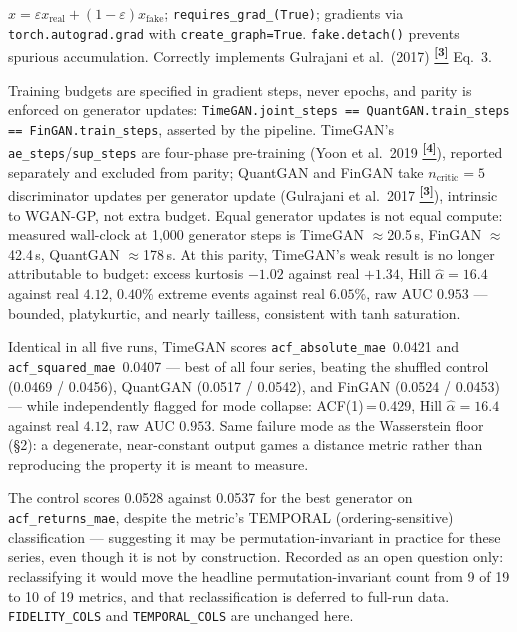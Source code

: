\documentclass[10pt]{article}
\newcommand{\auditrow}[5]{%
  \begin{tcolorbox}[mybox={#2}{#3},
    title={\textbf{[#1]}\quad #4},
    before skip=4pt, after skip=4pt, breakable]
  \small #5
  \end{tcolorbox}}
\newcommand{\tcite}[1]{%
  \hyperlink{R:#1}{\textsuperscript{\scriptsize\textbf{[#1]}}}}
\begin{document}
\auditrow{OK}{FGreen}{GBg}%
  {WGAN-GP gradient penalty computation is correct (QuantGAN \& FinGAN)}%
  {$\hat{x} = \varepsilon x_\text{real} + (1-\varepsilon)x_\text{fake}$; \texttt{requires\_grad\_(True)}; gradients via \texttt{torch.autograd.grad} with \texttt{create\_graph=True}. \texttt{fake.detach()} prevents spurious accumulation. Correctly implements Gulrajani et al.\ (2017)\tcite{3} Eq.~3.}

\auditrow{FIXED}{Amber}{ABg}%
  {TimeGAN training budget equalised on generator updates; result reattributed to architecture}%
  {Training budgets are specified in gradient steps, never epochs, and parity is enforced on generator updates: \texttt{TimeGAN.joint\_steps == QuantGAN.train\_steps == FinGAN.train\_steps}, asserted by the pipeline. TimeGAN's \texttt{ae\_steps}/\texttt{sup\_steps} are four-phase pre-training (Yoon et al.\ 2019\tcite{4}), reported separately and excluded from parity; QuantGAN and FinGAN take $n_\text{critic}=5$ discriminator updates per generator update (Gulrajani et al.\ 2017\tcite{3}), intrinsic to WGAN-GP, not extra budget. Equal generator updates is not equal compute: measured wall-clock at 1,000 generator steps is TimeGAN $\approx$20.5\,s, FinGAN $\approx$42.4\,s, QuantGAN $\approx$178\,s. At this parity, TimeGAN's weak result is no longer attributable to budget: excess kurtosis $-1.02$ against real $+1.34$, Hill $\hat\alpha=16.4$ against real $4.12$, $0.40\%$ extreme events against real $6.05\%$, raw AUC $0.953$ --- bounded, platykurtic, and nearly tailless, consistent with tanh saturation.}

\auditrow{CONCERN}{Amber}{ABg}%
  {A collapsed generator wins the volatility-clustering metrics}%
  {Identical in all five runs, TimeGAN scores \texttt{acf\_absolute\_mae}~0.0421 and \texttt{acf\_squared\_mae}~0.0407 --- best of all four series, beating the shuffled control (0.0469 / 0.0456), QuantGAN (0.0517 / 0.0542), and FinGAN (0.0524 / 0.0453) --- while independently flagged for mode collapse: ACF(1)\,=\,0.429, Hill $\hat\alpha=16.4$ against real $4.12$, raw AUC $0.953$. Same failure mode as the Wasserstein floor (\S2): a degenerate, near-constant output games a distance metric rather than reproducing the property it is meant to measure.}

\auditrow{OPEN QUESTION}{Indigo}{IBg}%
  {Shuffled control wins \texttt{acf\_returns\_mae} outright}%
  {The control scores 0.0528 against 0.0537 for the best generator on \texttt{acf\_returns\_mae}, despite the metric's TEMPORAL (ordering-sensitive) classification --- suggesting it may be permutation-invariant in practice for these series, even though it is not by construction. Recorded as an open question only: reclassifying it would move the headline permutation-invariant count from 9 of 19 to 10 of 19 metrics, and that reclassification is deferred to full-run data. \texttt{FIDELITY\_COLS} and \texttt{TEMPORAL\_COLS} are unchanged here.}
\end{document}
